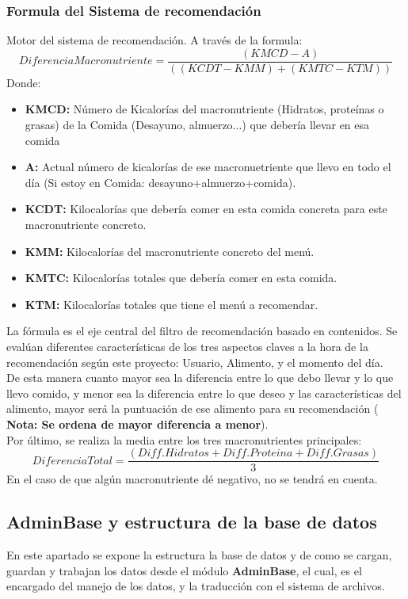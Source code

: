 \subsubsection{Formula del Sistema de recomendación}
Motor del sistema de recomendación. A través de la formula:
\begin{equation}
DiferenciaMacronutriente = \frac{(KMCD - A)}{((KCDT-KMM)+(KMTC-KTM))}
\end{equation}
Donde:
\begin{itemize}
\item \textbf{KMCD:} Número de Kicalorías del macronutriente (Hidratos, proteínas o grasas) de la Comida (Desayuno, almuerzo...) que debería llevar en esa comida
\item \textbf{A:} Actual número de kicalorías de ese macronuetriente que llevo en todo el día (Si estoy en Comida: desayuno+almuerzo+comida).
\item \textbf{KCDT:} Kilocalorías que debería comer en esta comida concreta para este macronutriente concreto.
\item \textbf{KMM:} Kilocalorías del macronutriente concreto del menú.
\item \textbf{KMTC:} Kilocalorías totales que debería comer en esta comida.
\item \textbf{KTM:} Kilocalorías totales que tiene el menú a recomendar.

\end{itemize}
La fórmula es el eje central del filtro de recomendación basado en contenidos. Se evalúan diferentes características de los tres aspectos claves a la hora de la recomendación según este proyecto: Usuario, Alimento, y el momento del día.\\
De esta manera cuanto mayor sea la diferencia entre lo que debo llevar y lo que llevo comido, y menor sea la diferencia entre lo que deseo y las características del alimento, mayor será la puntuación de ese alimento para su recomendación ( \textbf{Nota: Se ordena de mayor diferencia a menor}).\\
Por último, se realiza la media entre los tres macronutrientes principales:
\begin{equation}
DiferenciaTotal = \frac{(Diff.Hidratos+Diff.Proteina+Diff.Grasas)}{3}
\end{equation} 
En el caso de que algún macronutriente dé negativo, no se tendrá en cuenta.


\subsection{AdminBase y estructura de la base de datos}
En este apartado se expone la estructura la base de datos y de como se cargan, guardan y trabajan los datos desde el módulo \textbf{AdminBase}, el cual, es el encargado del manejo de los datos, y la traducción con el sistema de archivos.
